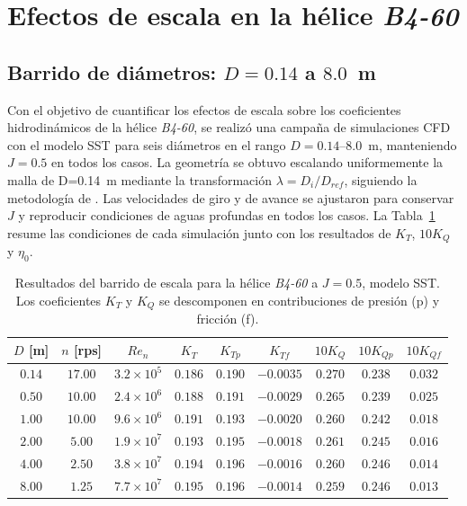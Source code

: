 \section{Efectos de escala en la hélice \textit{B4-60}}
\label{sec:helices_escala}

\subsection{Barrido de diámetros: $D = 0.14$ a $8.0$~m}
\label{sec:helices_sweep}

Con el objetivo de cuantificar los efectos de escala sobre los coeficientes hidrodinámicos de la hélice \textit{B4-60}, se realizó una campaña de simulaciones CFD con el modelo SST para seis diámetros en el rango $D = 0.14$--$8.0$~m, manteniendo $J = 0.5$ en todos los casos. La geometría se obtuvo escalando uniformemente la malla de D=0.14~m mediante la transformación $\lambda = D_i / D_{ref}$, siguiendo la metodología de \citet{gaggero2018transition}. Las velocidades de giro y de avance se ajustaron para conservar $J$ y reproducir condiciones de aguas profundas en todos los casos. La Tabla~\ref{tab:barrido_b460} resume las condiciones de cada simulación junto con los resultados de $K_T$, $10K_Q$ y $\eta_0$.

\begin{table}[htpb]
\centering
\caption{Resultados del barrido de escala para la hélice \textit{B4-60} a $J = 0.5$, modelo SST. Los coeficientes $K_T$ y $K_Q$ se descomponen en contribuciones de presión (p) y fricción (f).}
\label{tab:barrido_b460}
\small
\begin{tabular}{ccccccccc}
\hline
$D$ [m] & $n$ [rps] & $Re_n$ & $K_T$ & $K_{Tp}$ & $K_{Tf}$ & $10K_Q$ & $10K_{Qp}$ & $10K_{Qf}$ \\
\hline
$0.14$ & $17.00$ & $3.2 \times 10^5$ & $0.186$ & $0.190$ & $-0.0035$ & $0.270$ & $0.238$ & $0.032$ \\
$0.50$ & $10.00$ & $2.4 \times 10^6$ & $0.188$ & $0.191$ & $-0.0029$ & $0.265$ & $0.239$ & $0.025$ \\
$1.00$ & $10.00$ & $9.6 \times 10^6$ & $0.191$ & $0.193$ & $-0.0020$ & $0.260$ & $0.242$ & $0.018$ \\
$2.00$ & $5.00$  & $1.9 \times 10^7$ & $0.193$ & $0.195$ & $-0.0018$ & $0.261$ & $0.245$ & $0.016$ \\
$4.00$ & $2.50$  & $3.8 \times 10^7$ & $0.194$ & $0.196$ & $-0.0016$ & $0.260$ & $0.246$ & $0.014$ \\
$8.00$ & $1.25$  & $7.7 \times 10^7$ & $0.195$ & $0.196$ & $-0.0014$ & $0.259$ & $0.246$ & $0.013$ \\
\hline
\end{tabular}
\end{table}

